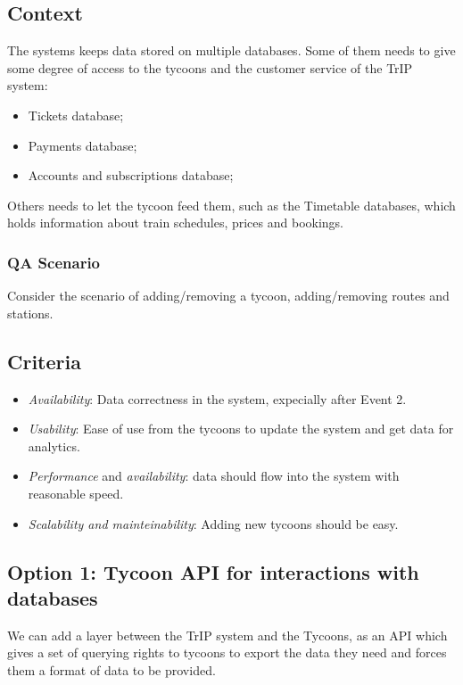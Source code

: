 \subsection*{Context}
The systems keeps data stored on multiple databases. 
Some of them needs to give some degree of access to the tycoons and the customer service of the TrIP system:
\begin{itemize}
    \item Tickets database;
    \item Payments database;
    \item Accounts and subscriptions database;
\end{itemize}

Others needs to let the tycoon feed them, such as the Timetable databases, which holds information about train schedules,
prices and bookings.

\subsubsection*{QA Scenario} %
Consider the scenario of adding/removing a tycoon, adding/removing routes and stations.
\subsection*{Criteria}
\begin{itemize}
    \item \textit{Availability}: Data correctness in the system, expecially after Event 2.
    \item \textit{Usability}: Ease of use from the tycoons to update the system and get data for analytics.
    \item \textit{Performance} and \textit{availability}: data should flow into the system with reasonable speed.
    \item \textit{Scalability and mainteinability}: Adding new tycoons should be easy.
\end{itemize}

\subsection*{Option 1: Tycoon API for interactions with databases}

We can add a layer between the TrIP system and the Tycoons, as an API which gives a set of querying rights to tycoons to export the data they need and forces them a format of data to be provided.

